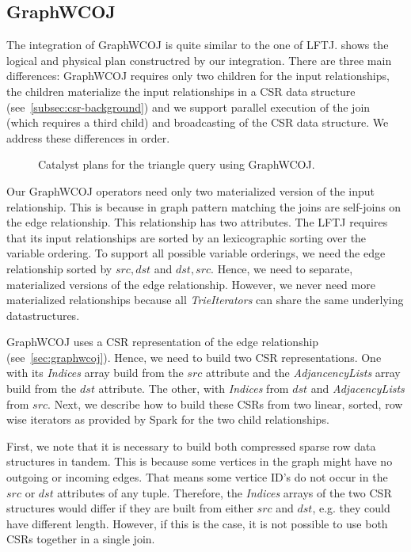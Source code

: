 \subsection{GraphWCOJ} \label{subsec:spark-integration-graphWCOJ}
The integration of GraphWCOJ is quite similar to the one of \textsc{LFTJ}.
 shows the logical and physical plan constructred by our integration.
There are three main differences: GraphWCOJ requires only two children for the input relationships, the children materialize the input
relationships in a CSR data structure (see~\cref{subsec:csr-background}) and we support parallel execution of the join (which requires
a third child) and broadcasting of the CSR data structure.
We address these differences in order.

\begin{figure}
    \caption{Catalyst plans for the triangle query using GraphWCOJ.}
    \label{fig:graphWCOJ-catalyst-plan}
\end{figure}

Our GraphWCOJ operators need only two materialized version of the input relationship.
This is because in graph pattern matching the joins are self-joins on the edge relationship.
This relationship has two attributes.
The \textsc{LFTJ} requires that its input relationships are sorted by an lexicographic sorting over the variable ordering.
To support all possible variable orderings, we need the edge relationship sorted by $src, dst$ and $dst, src$.
Hence, we need to separate, materialized versions of the edge relationship.
However, we never need more materialized relationships because all \textit{TrieIterators} can share the same underlying datastructures.

GraphWCOJ uses a CSR representation of the edge relationship (see~\cref{sec:graphwcoj}).
Hence, we need to build two CSR representations.
One with its \textit{Indices} array build from the $src$ attribute and the \textit{AdjancencyLists} array build from the $dst$ attribute.
The other, with \textit{Indices} from $dst$ and \textit{AdjacencyLists} from $src$.
Next, we describe how to build these CSRs from two linear, sorted, row wise iterators as provided by Spark for the two child relationships.

First, we note that it is necessary to build both compressed sparse row data structures in tandem.
This is because some vertices in the graph might have no outgoing or incoming edges.
That means some vertice ID's do not occur in the $src$ or $dst$ attributes of any tuple.
Therefore, the \textit{Indices} arrays of the two CSR structures would differ if they are built from either $src$ and $dst$, e.g.
they could have different length.
However, if this is the case, it is not possible to use both CSRs together in a single join.


